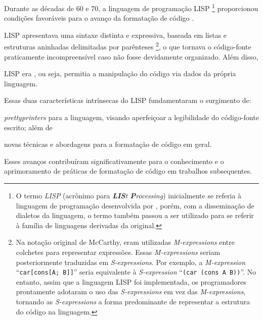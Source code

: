 \documentclass
  [11pt, a4paper, english, openright, sumario = tradicional, twoside, brazil]
  {abntex2}
\begin{document}
  Durante as décadas de 60 e 70, a linguagem de programação LISP%
  \footnote
    {O termo \textit{LISP} (acrônimo para
     \textit{\textbf{LIS}t \textbf{P}rocessing}) inicialmente se referia à
     linguagem de programação desenvolvida por
     \textcite{mccarthy-1960-recursive}, porém, com a disseminação de dialetos
     da linguagem, o termo também passou a ser utilizado para se referir à
     família de linguagens derivadas da original.}
  proporcionou condições favoráveis para o avanço da formatação de código
  \cite[2]{yelland-2015-rfmt}.
  \begin{inparaenum}
    \item LISP apresentava uma sintaxe distinta e expressiva, baseada em listas
          e estruturas aninhadas delimitadas por parênteses%
          \footnote
            {Na notação original de McCarthy, eram utilizadas
             \textit{M-expressions} entre colchetes para representar
             expressões. Essas \textit{M-expressions} seriam posteriormente
             traduzidas em \textit{S-expressions}. Por exemplo, a
             \textit{M-expression} ``\texttt{car[cons[A; B]]}'' seria
             equivalente à \textit{S-expression} ``\texttt{(car (cons A B))}''.
             No entanto, assim que a linguagem LISP foi implementada, os
             programadores prontamente adotaram o uso das
             \textit{S-expressions} em vez das \textit{M-expressions}, tornando
             as \textit{S-expressions} a forma predominante de representar a
             estrutura do código na linguagem.},
          o que tornava o código-fonte praticamente incompreensível caso não
          fosse devidamente organizado. Além disso,
    \item LISP era , ou seja, permitia a manipulação do
          código via dados da própria linguagem.
  \end{inparaenum}
  Essas duas características intrínsecas do LISP fundamentaram o surgimento de:
  \begin{inparaenum}
    \item \textit{prettyprinters} para a linguagem, visando aperfeiçoar a
          legibilidade do código-fonte escrito; além de
    \item novas técnicas e abordagens para a formatação de código em geral.
  \end{inparaenum}
  Esses avanços contribuíram significativamente para o conhecimento e o
  aprimoramento de práticas de formatação de código em trabalhos subsequentes.
\end{document}
